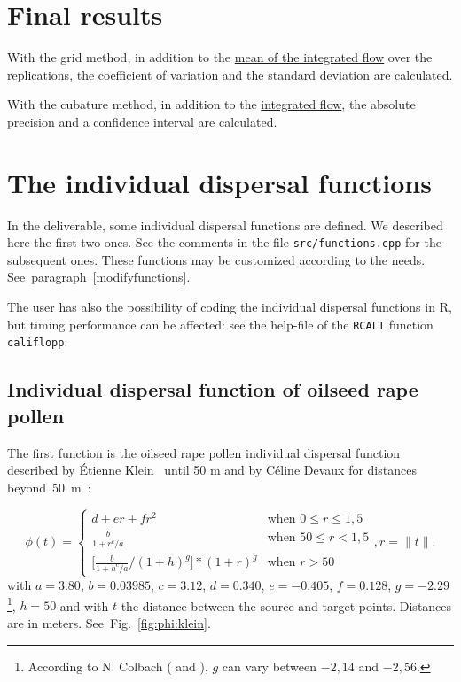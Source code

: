 \section{Final results}

With the grid  method,
in addition to  the
\hyperlink{gridmean}{mean of the integrated flow}
over the replications,
the \hyperlink{gridcoefvar}{coefficient of variation} and
the \hyperlink{gridet}{standard deviation}
are calculated.

\noindent
With the cubature  method,
in addition to  the
\hyperlink{cubmean}{integrated flow},  the absolute
precision and  a
\hyperlink{cubic}{confidence interval} are calculated.

\section{The individual dispersal functions}
\label{sec:individualfunctions}
In the deliverable, some individual dispersal functions are defined.
We described here the first two ones. See  the comments in
the file \texttt{src/functions.cpp} for the subsequent ones.
These functions may be customized according to the needs.
See~paragraph~\ref{modifyfunctions}.

 The user has also the possibility
of coding the individual dispersal functions in R, but timing
performance can be affected: see the help-file
of the \verb+RCALI+ function \texttt{califlopp}.


\subsection{Individual dispersal function of oilseed rape pollen}
\label{pollen:funct}
The first function is the oilseed rape
pollen individual dispersal function
described by Étienne Klein~\cite{Klein:2006} until 50 m
and by Céline Devaux for distances beyond~50~m~\cite{Devaux:2006}:

\begin{equation}
  \label{eq:dispersion:klein}
  \phi(t)= \left\{  \begin{array}{ll}d+er+fr^2 & \textrm{when \(0\leq r\leq 1,5\)}\\
      \frac{b}{1+r^c/a} & \textrm{when \(50 \leq r < 1,5\)}\\
\text{[} \frac{b}{1+h^c/a} / (1+h)^g \text{]}  * ( 1+r)^g & \textrm{when \(r> 50\)}
\end{array}
  \right.,  r=\parallel t\parallel. 
\end{equation} 
with $a=3.80$, $b=0.03985$, $c=3.12$, $d=0.340$, $e=-0.405$,
$f=0.128$, $g=-2.29$\footnote{According to N. Colbach
  (\cite{Colbach1:2001}
and \cite{Colbach2:2001}), $g$  can vary between
$-2,14$ and $-2,56$.}, $h=50$
and with
$t$ the  distance between the source and  target points.
Distances are in meters.
See~Fig.~\ref{fig:phi:klein}.

